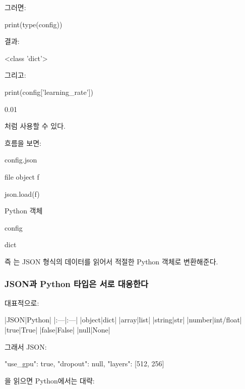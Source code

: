 그러면:

\begin{dhkcode}
print(type(config))
\end{dhkcode}

결과:

\begin{dhkzsh}
<class 'dict'>
\end{dhkzsh}

그리고:

\begin{dhkcode}
print(config['learning_rate'])
\end{dhkcode}

\begin{dhkzsh}
0.01
\end{dhkzsh}

처럼 사용할 수 있다.

흐름을 보면:

\begin{dhksmry}[centered]
config.json

\da

file object f

\da

json.load(f)

\da

Python 객체

\da

config

\da

dict
\end{dhksmry}

즉 는 JSON 형식의 데이터를 읽어서 적절한 Python 객체로 변환해준다.

\subsubsection{JSON과 Python 타입은 서로 대응한다}

대표적으로:

\begin{dhktable}
|JSON|Python|
|:---|:---|
|object|dict|
|array|list|
|string|str|
|number|int/float|
|true|True|
|false|False|
|null|None|
\end{dhktable}

그래서 JSON:

\begin{dhkzsh}
{
    "use_gpu": true,
    "dropout": null,
    "layers": [512, 256]
}
\end{dhkzsh}

을 읽으면 Python에서는 대략:

